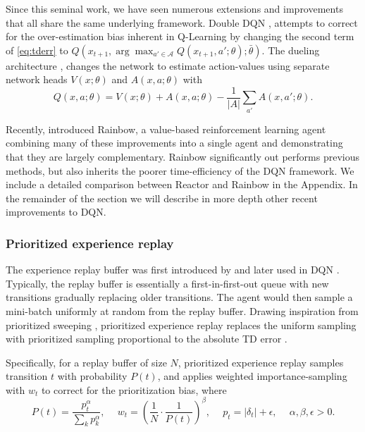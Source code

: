 \documentclass{article}
\begin{document}
Since this seminal work, we have seen numerous extensions and improvements that 
all share the same underlying framework. Double DQN \citep{van2016deep}, 
attempts to correct for the over-estimation bias inherent in Q-Learning by 
changing the second term of \eqref{eq:tderr} to $Q(x_{t+1}, \arg\max_{a' \in \mathcal{A}} 
Q(x_{t+1}, a'; \theta); \bar \theta)$. The dueling architecture 
\citep{wang2015dueling}, changes the network to estimate 
action-values using separate network heads $V(x; \theta)$ and $A(x, a; \theta)$ with
$$Q(x, a; \theta) = V(x; \theta) + A(x, a; \theta) - \frac{1}{|A|} \sum_{a'} A(x, a'; \theta).$$

Recently, \citet{rainbow} introduced Rainbow, a value-based 
reinforcement learning agent combining many of these improvements into a single 
agent and demonstrating that they are largely complementary. Rainbow significantly 
out performs previous methods, but also inherits the poorer time-efficiency of the DQN framework.
We include a detailed comparison between Reactor and Rainbow in the Appendix. 
In the remainder of the section we will describe in more depth other recent 
improvements to DQN.

\subsubsection{Prioritized experience replay}
The experience replay buffer was first introduced by \citet{lin1992self} and 
later used in DQN \citep{mnih15human}. Typically, the replay buffer is 
essentially a first-in-first-out queue with new transitions gradually replacing 
older transitions. The agent would then sample a mini-batch uniformly at random 
from the replay buffer. Drawing inspiration from prioritized sweeping 
\citep{moore1993prioritized}, prioritized experience replay replaces the uniform 
sampling with prioritized sampling proportional to the absolute TD error 
\citep{schaul16prioritized}.

Specifically, for a replay buffer of size $N$, prioritized experience replay 
samples transition $t$ with probability $P(t)$, and applies weighted 
importance-sampling with $w_t$ to correct for the prioritization bias, where
\begin{equation}
\label{eq-importance}
P(t) = \frac{p_t^\alpha}{\sum_k p_k^\alpha},\ \quad w_t = \left( \frac{1}{N} 
\cdot \frac{1}{P(t)} \right)^\beta,\ \quad p_t = |\delta_t| + \epsilon,\ \quad 
\alpha, \beta, \epsilon > 0.
\end{equation}
\end{document}
